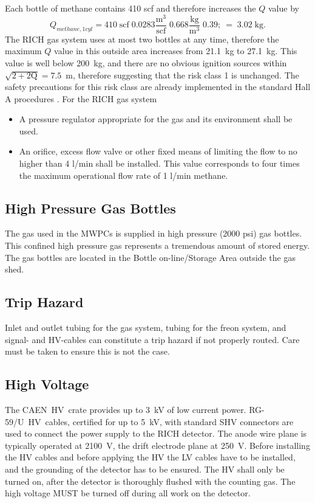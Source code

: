 \begin{safetyen}{0}{0}
Each bottle of methane contains 410 scf and therefore increases the $Q$ value by
\begin{equation}
Q_{methane,1cyl} = 410 \; \mbox{scf} \; 0.0283 \frac{\mbox{m}^3}{\mbox{scf}} \; 0.668 \frac{\mbox{kg}}{\mbox{m}^3} \; 0.39 ;\ = \; 3.02 \; \mbox{kg}.
\end{equation}
The RICH gas system uses at most two bottles at any time, therefore the maximum $Q$ value in
this outside area increases  from 21.1~kg to 27.1~kg. This value is well below 200~kg, and 
there are no obvious ignition sources within $\sqrt{2 + 2 \mbox{Q}} = 7.5$~m, therefore
suggesting that the risk class 1 is unchanged. The safety precautions for this risk class
are already implemented in the standard Hall A procedures \cite{Hawgswww}. For the RICH gas system
\begin{itemize}

\item A pressure regulator appropriate for the gas and its environment shall be used. 
 
\item An orifice, excess flow valve or other fixed means of limiting the flow to no higher
than 4 l/min shall be installed. This value corresponds to four times the maximum
operational flow rate of 1 l/min methane.

\end{itemize}

\subsection{High Pressure Gas Bottles} The gas used in the MWPCs is supplied in high pressure (2000 psi) 
gas bottles. This confined high pressure gas represents a tremendous amount of stored energy. 
The gas bottles are located  in the Bottle on-line/Storage Area outside the gas shed.

\subsection{Trip Hazard} Inlet and outlet tubing for the gas system, tubing for the freon system,
and signal- and HV-cables can constitute a trip hazard if not 
properly routed. Care must be taken to ensure this is not the case. 

\subsection{High Voltage} The CAEN~HV~crate
provides up to 3~kV of low current power.
RG-59/U~HV~cables, certified for up to 5~kV, with standard SHV 
connectors are used to connect the power supply to the RICH detector.
The anode wire plane is typically operated at 2100~V, the 
drift electrode plane at 250~V.
Before installing the HV cables and before applying the HV the 
LV cables have to be installed, and the grounding of the detector 
has to be ensured. The HV shall only be turned on, after the 
detector is thoroughly flushed with the counting gas.
The high voltage MUST be turned off during all work on the detector.

\end{safetyen}

